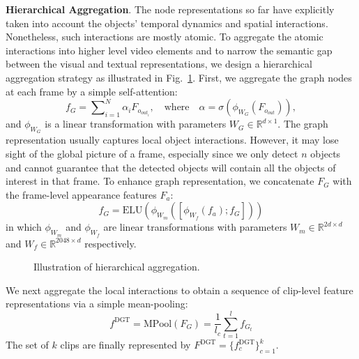 \documentclass[10pt,journal,compsoc]{IEEEtran}
\begin{document}
\noindent \textbf{Hierarchical Aggregation}.
The node representations so far have explicitly taken into account the objects' temporal dynamics and spatial interactions. Nonetheless, such interactions are mostly atomic. 
To aggregate the atomic interactions into higher level video elements and to narrow the semantic gap between the visual and textual representations, we design a hierarchical aggregation strategy as illustrated in Fig.~\ref{fig:hpool}. First, we aggregate the graph nodes at each frame by a simple self-attention:
\begin{equation}
   f_G = \sum\nolimits_{i=1}^N \alpha_i F_{o_{out_i}}, \quad \text{where} \quad \alpha = \sigma(\phi_{W_G}(F_{o_{out}})),
\end{equation}
and $\phi_{W_G}$ is a linear transformation with parameters $W_G \in \mathbb{R}^{d \times 1}$. 
The graph representation usually captures local object interactions. However, it may lose sight of the global picture of a frame, especially since we only detect $n$ objects and cannot guarantee that the detected objects will contain all the objects of interest in that frame. To enhance graph representation, we concatenate $F_G$ with the frame-level appearance features $F_a$:
\begin{equation}
\label{equ:ff}
    f_G = \text{ELU}(\phi_{W_m}([\phi_{W_f}(f_a);f_G]))
\end{equation}
in which $\phi_{W_m}$ and $\phi_{W_f}$ are linear transformations with parameters $W_m\in\mathbb{R}^{2d \times d}$ and $W_f\in\mathbb{R}^{2048\times d}$ respectively.
\begin{figure}[t]
  \begin{center}
  \end{center}
  \vspace{-0.3cm}
  \caption{Illustration of hierarchical aggregation.}
  \label{fig:hpool}
  \vspace{-0.4cm}
\end{figure}

We next aggregate the local interactions to obtain a sequence of clip-level feature representations via a simple mean-pooling:
\begin{equation}
\label{equ:fc}
 f^{\text{DGT}}=\text{MPool}(F_G)=\frac{1}{l_c}\sum\limits_{t=1}^lf_{G_t}
\end{equation}
\noindent The set of $k$ clips are finally represented by  $F^{\text{DGT}}\!=\!\{f_c^{\text{DGT}}\}_{c=1}^k$. 
\end{document}
